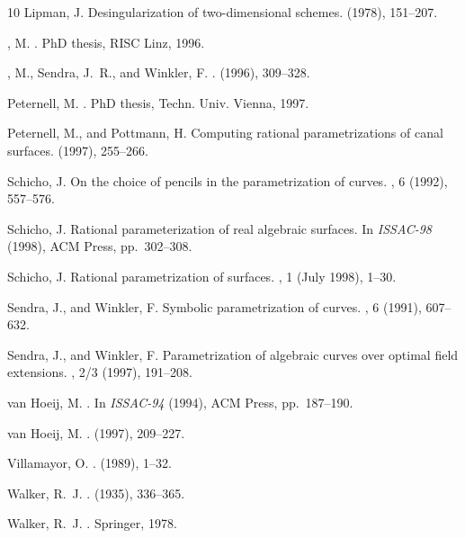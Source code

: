 \begin{thebibliography}{10}
{\sc Lipman, J.}
\newblock Desingularization of two-dimensional schemes.
 (1978), 151--207.

{, M.}
.
\newblock PhD thesis, RISC Linz, 1996.

{, M., Sendra, J.~R., and Winkler, F.}
.
 (1996), 309--328.

{\sc Peternell, M.}
.
\newblock PhD thesis, Techn. Univ. Vienna, 1997.

{\sc Peternell, M., and Pottmann, H.}
\newblock Computing rational parametrizations of canal surfaces.
 (1997), 255--266.

{\sc Schicho, J.}
\newblock On the choice of pencils in the parametrization of curves.
, 6 (1992), 557--576.

{\sc Schicho, J.}
\newblock Rational parameterization of real algebraic surfaces.
\newblock In {\em ISSAC-98\/} (1998), ACM Press, pp.~302--308.

{\sc Schicho, J.}
\newblock Rational parametrization of surfaces.
, 1 (July 1998), 1--30.

{\sc Sendra, J., and Winkler, F.}
\newblock Symbolic parametrization of curves.
, 6 (1991), 607--632.

{\sc Sendra, J., and Winkler, F.}
\newblock Parametrization of algebraic curves over optimal field extensions.
, 2/3 (1997), 191--208.

{\sc van Hoeij, M.}
.
\newblock In {\em ISSAC-94\/} (1994), ACM Press, pp.~187--190.

{\sc van Hoeij, M.}
.
 (1997), 209--227.

{\sc Villamayor, O.}
.
 (1989), 1--32.

{\sc Walker, R.~J.}
.
 (1935), 336--365.

{\sc Walker, R.~J.}
.
\newblock Springer, 1978.

\end{thebibliography}


